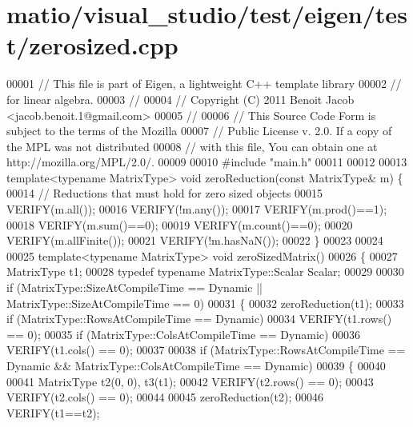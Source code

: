 \hypertarget{matio_2visual__studio_2test_2eigen_2test_2zerosized_8cpp_source}{}\section{matio/visual\+\_\+studio/test/eigen/test/zerosized.cpp}
\label{matio_2visual__studio_2test_2eigen_2test_2zerosized_8cpp_source}

\begin{DoxyCode}
00001 \textcolor{comment}{// This file is part of Eigen, a lightweight C++ template library}
00002 \textcolor{comment}{// for linear algebra.}
00003 \textcolor{comment}{//}
00004 \textcolor{comment}{// Copyright (C) 2011 Benoit Jacob <jacob.benoit.1@gmail.com>}
00005 \textcolor{comment}{//}
00006 \textcolor{comment}{// This Source Code Form is subject to the terms of the Mozilla}
00007 \textcolor{comment}{// Public License v. 2.0. If a copy of the MPL was not distributed}
00008 \textcolor{comment}{// with this file, You can obtain one at http://mozilla.org/MPL/2.0/.}
00009 
00010 \textcolor{preprocessor}{#include "main.h"}
00011 
00012 
00013 \textcolor{keyword}{template}<\textcolor{keyword}{typename} MatrixType> \textcolor{keywordtype}{void} zeroReduction(\textcolor{keyword}{const} MatrixType& m) \{
00014   \textcolor{comment}{// Reductions that must hold for zero sized objects}
00015   VERIFY(m.all());
00016   VERIFY(!m.any());
00017   VERIFY(m.prod()==1);
00018   VERIFY(m.sum()==0);
00019   VERIFY(m.count()==0);
00020   VERIFY(m.allFinite());
00021   VERIFY(!m.hasNaN());
00022 \}
00023 
00024 
00025 \textcolor{keyword}{template}<\textcolor{keyword}{typename} MatrixType> \textcolor{keywordtype}{void} zeroSizedMatrix()
00026 \{
00027   MatrixType t1;
00028   \textcolor{keyword}{typedef} \textcolor{keyword}{typename} MatrixType::Scalar Scalar;
00029 
00030   \textcolor{keywordflow}{if} (MatrixType::SizeAtCompileTime == Dynamic || MatrixType::SizeAtCompileTime == 0)
00031   \{
00032     zeroReduction(t1);
00033     \textcolor{keywordflow}{if} (MatrixType::RowsAtCompileTime == Dynamic)
00034       VERIFY(t1.rows() == 0);
00035     \textcolor{keywordflow}{if} (MatrixType::ColsAtCompileTime == Dynamic)
00036       VERIFY(t1.cols() == 0);
00037 
00038     \textcolor{keywordflow}{if} (MatrixType::RowsAtCompileTime == Dynamic && MatrixType::ColsAtCompileTime == Dynamic)
00039     \{
00040 
00041       MatrixType t2(0, 0), t3(t1);
00042       VERIFY(t2.rows() == 0);
00043       VERIFY(t2.cols() == 0);
00044 
00045       zeroReduction(t2);
00046       VERIFY(t1==t2);

\end{DoxyCode}
